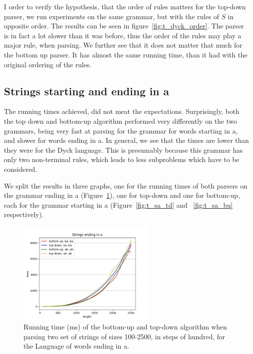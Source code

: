 I order to verify the hypothesis, that the order of rules matters for the top-down parser, we run experiments on the same grammar, but with the rules of $S$ in opposite order.
The results can be seen in figure~\ref{fig:t_dyck_order}.
The parser is in fact a lot slower than it was before, thus the order of the rules may play a major rule, when parsing.
We further see that it does not matter that much for the bottom up parser.
It has almost the same running time, than it had with the original ordering of the rules.

\subsection{Strings starting and ending in a}

The running times achieved, did not meat the expectations.
Surprisingly, both the top down and bottom-up algorithm performed very differently on the two grammars, being very fast at parsing for the grammar for words starting in a, and slower for words ending in a.
In general, we see that the times are lower than they were for the Dyck language.
This is presumably because this grammar has only two non-terminal rules, which leads to less subproblems which have to be considered.

We split the results in three graphs, one for the running times of both parsers on the grammar ending in a (Figure~\ref{fig:t_ea_td_bu}), one for top-down and one for bottom-up, each for the grammar starting in a (Figure~\ref{fig:t_sa_td} and ~\ref{fig:t_sa_bu} respectively).

\begin{figure}[h!]
    \centering
    \includegraphics[width=0.6\textwidth]{Images/t_ea_td_bu.jpg}
    \caption{Running time (ms) of the bottom-up and top-down algorithm when parsing two set of strings of sizes 100-2500, in steps of hundred, for the Language of words ending in a.}
    \label{fig:t_ea_td_bu}
\end{figure}

